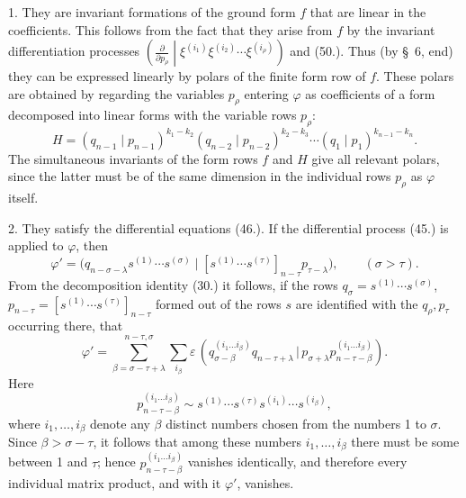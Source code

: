 \documentclass[11pt]{article}
\providecommand{\pair}[2]{(#1\,|\,#2)}
\providecommand{\eps}{\varepsilon}
\begin{document}
1. They are invariant formations of the ground form $f$ that are linear in the coefficients. This follows from the fact that they arise from $f$ by the invariant differentiation processes $\left(\frac{\partial}{\partial p_\rho}\middle|\xi^{(i_1)}\xi^{(i_2)}\cdots\xi^{(i_\rho)}\right)$ and (50.). Thus (by \S\ 6, end) they can be expressed linearly by polars of the finite form row of $f$. These polars are obtained by regarding the variables $p_\rho$ entering $\varphi$ as coefficients of a form decomposed into linear forms with the variable rows $p_\rho$:
\begin{equation}
 H=(q_{n-1}\mid p_{n-1})^{k_1-k_2}(q_{n-2}\mid p_{n-2})^{k_2-k_3}\cdots(q_1\mid p_1)^{k_{n-1}-k_n}.
\tag{52}
\end{equation}
The simultaneous invariants of the form rows $f$ and $H$ give all relevant polars, since the latter must be of the same dimension in the individual rows $p_\rho$ as $\varphi$ itself.

2. They satisfy the differential equations (46.). If the differential process (45.) is applied to $\varphi$, then
\[
 \varphi'=\bigl(q_{n-\sigma-\lambda}s^{(1)}\cdots s^{(\sigma)}\mid [s^{(1)}\cdots s^{(\tau)}]_{n-\tau}p_{\tau-\lambda}\bigr),\qquad (\sigma>\tau).
\]
From the decomposition identity (30.) it follows, if the rows $q_\sigma=s^{(1)}\cdots s^{(\sigma)}$, $p_{n-\tau}=[s^{(1)}\cdots s^{(\tau)}]_{n-\tau}$ formed out of the rows $s$ are identified with the $q_\rho,p_\tau$ occurring there, that
\[
 \varphi'=\sum_{\beta=\sigma-\tau+\lambda}^{n-\tau,\sigma}\sum_{i_\beta}\eps\,
 \pair{q_{\sigma-\beta}^{(i_1\ldots i_\beta)}q_{n-\tau+\lambda}}{p_{\sigma+\lambda}p_{n-\tau-\beta}^{(i_1\ldots i_\beta)}}.
\]
Here
\[
 p_{n-\tau-\beta}^{(i_1\ldots i_\beta)}\sim s^{(1)}\cdots s^{(\tau)}s^{(i_1)}\cdots s^{(i_\beta)},
\]
where $i_1,
\ldots,i_\beta$ denote any $\beta$ distinct numbers chosen from the numbers 1 to $\sigma$. Since $\beta>\sigma-\tau$, it follows that among these numbers $i_1,
\ldots,i_\beta$ there must be some between 1 and $\tau$; hence $p_{n-\tau-\beta}^{(i_1\ldots i_\beta)}$ vanishes identically, and therefore every individual matrix product, and with it $\varphi'$, vanishes.
\end{document}
